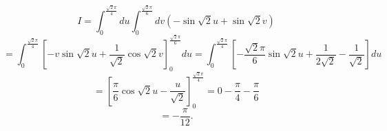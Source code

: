 \documentclass[a4paper,10pt,report]{amsart}
\theoremstyle{plain}
\theoremstyle{definition}
\theoremstyle{remark}
\begin{document}
\begin{enumerate}
\begin{equation*}
            I=\int_{0}^{\frac{\sqrt{2}\pi}{4}}du\int_{0}^{\frac{\sqrt{2}\pi}{6}}dv(-\sin{\sqrt{2}u}+\sin{\sqrt{2}v})
        \end{equation*}
        \begin{equation*}
            =\int_{0}^{\frac{\sqrt{2}\pi}{4}}{\left[-v\sin{\sqrt{2}u}+\frac{1}{\sqrt{2}}\cos{\sqrt{2}v}\right]}_{0}^{\frac{\sqrt{2}\pi}{6}}du=\int_{0}^{\frac{\sqrt{2}\pi}{4}}{\left[-\frac{\sqrt{2}\pi}{6}\sin{\sqrt{2}u}+\frac{1}{2\sqrt{2}}-\frac{1}{\sqrt{2}}\right]}du
        \end{equation*}
        \begin{equation*}
            ={\left[\frac{\pi}{6}\cos{\sqrt{2}u}-\frac{u}{\sqrt{2}}\right]}_{0}^{\frac{\sqrt{2}\pi}{4}}=0-\frac{\pi}{4}-\frac{\pi}{6}
        \end{equation*}
        \begin{equation*}
            =-\frac{\pi}{12}.
        \end{equation*}
    \end{enumerate}
\end{document}
